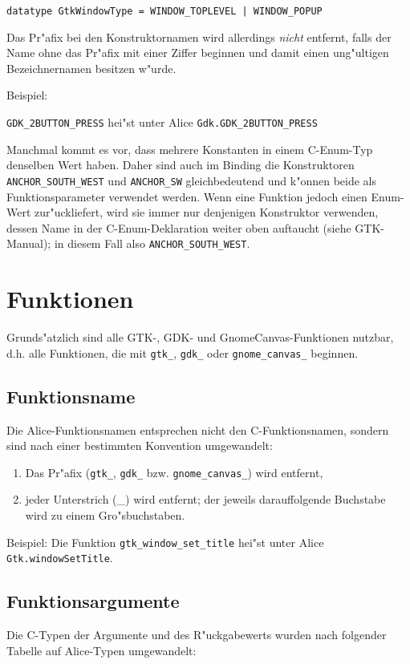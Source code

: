 \documentclass{article}
\begin{document}
\texttt{datatype GtkWindowType = WINDOW_TOPLEVEL | WINDOW_POPUP}

Das Pr"afix bei den Konstruktornamen wird allerdings \textit{nicht} entfernt,
falls der Name ohne das Pr"afix mit einer Ziffer beginnen und damit
einen ung"ultigen Bezeichnernamen besitzen w"urde.

Beispiel:

\texttt{GDK\_2BUTTON\_PRESS} hei"st unter Alice 
  \texttt{Gdk.GDK\_2BUTTON\_PRESS}

Manchmal kommt es vor, dass mehrere Konstanten in einem C-Enum-Typ denselben
Wert haben. Daher sind auch im Binding die Konstruktoren
\texttt{ANCHOR\_SOUTH\_WEST} und \texttt{ANCHOR\_SW} gleichbedeutend
und k"onnen beide als Funktionsparameter verwendet werden. Wenn eine Funktion
jedoch einen Enum-Wert zur"uckliefert, wird sie immer nur denjenigen
Konstruktor verwenden, dessen Name in der C-Enum-Deklaration weiter oben
auftaucht (siehe GTK-Manual); in diesem Fall also \texttt{ANCHOR\_SOUTH\_WEST}.



\section{Funktionen}
Grunds"atzlich sind alle GTK-, GDK- und GnomeCanvas-Funktionen nutzbar, d.h.
alle Funktionen, die mit \texttt{gtk\_}, \texttt{gdk\_} oder
\texttt{gnome\_canvas\_} beginnen.

\subsection{Funktionsname}
Die Alice-Funktionsnamen entsprechen nicht den C-Funktionsnamen, sondern sind
nach einer bestimmten Konvention umgewandelt:
\begin{enumerate}
\item Das Pr"afix (\texttt{gtk\_}, \texttt{gdk\_} bzw. 
      \texttt{gnome\_canvas\_}) wird entfernt,
\item jeder Unterstrich (\_) wird entfernt; der jeweils darauffolgende
      Buchstabe wird zu einem Gro"sbuchstaben.
\end{enumerate}

Beispiel: Die Funktion \texttt{gtk\_window\_set\_title} hei"st unter Alice
\texttt{Gtk.windowSetTitle}.

\subsection{Funktionsargumente}
Die C-Typen der Argumente und des R"uckgabewerts wurden nach folgender Tabelle
auf Alice-Typen umgewandelt:
\end{document}
